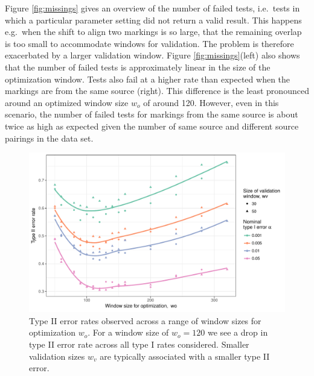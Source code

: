 \documentclass[12pt]{article}
\begin{document}

Figure \ref{fig:missings} gives an overview of the number of failed
tests, i.e.~tests in which a particular parameter setting did not return
a valid result. This happens e.g.~when the shift to align two markings
is so large, that the remaining overlap is too small to accommodate
windows for validation. The problem is therefore exacerbated by a larger
validation window. Figure \ref{fig:missings}(left) also shows that the
number of failed tests is approximately linear in the size of the
optimization window. Tests also fail at a higher rate than expected when
the markings are from the same source (right). This difference is the
least pronounced around an optimized window size \(w_o\) of around 120.
However, even in this scenario, the number of failed tests for markings
from the same source is about twice as high as expected given the number
of same source and different source pairings in the data set.

\begin{figure}

{\centering \includegraphics[width=.8\textwidth]{figures/type2-1} 

}

\caption{Type II error rates observed across a range of window sizes for optimization $w_o$. For a window size of $w_o = 120$ we see a drop in type II error rate across all type I rates considered. Smaller validation sizes $w_v$ are typically associated with a smaller type II error.}\label{fig:type2}
\end{figure}
\end{document}
